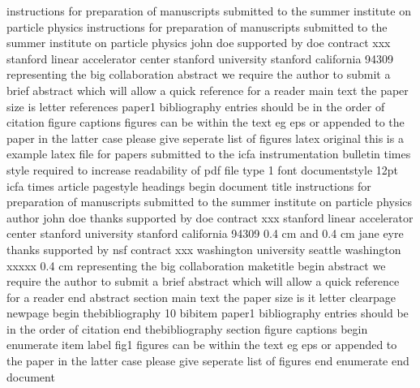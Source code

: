 instructions for preparation of manuscripts submitted to the summer institute on particle physics instructions for preparation of manuscripts submitted to the summer institute on particle physics john doe supported by doe contract xxx stanford linear accelerator center stanford university stanford california 94309 representing the big collaboration abstract we require the author to submit a brief abstract which will allow a quick reference for a reader main text the paper size is letter references paper1 bibliography entries should be in the order of citation figure captions figures can be within the text eg eps or appended to the paper in the latter case please give seperate list of figures latex original this is a example latex file for papers submitted to the icfa instrumentation bulletin times style required to increase readability of pdf file type 1 font documentstyle 12pt icfa times article pagestyle headings begin document title instructions for preparation of manuscripts submitted to the summer institute on particle physics author john doe thanks supported by doe contract xxx stanford linear accelerator center stanford university stanford california 94309 0.4 cm and 0.4 cm jane eyre thanks supported by nsf contract xxx washington university seattle washington xxxxx 0.4 cm representing the big collaboration maketitle begin abstract we require the author to submit a brief abstract which will allow a quick reference for a reader end abstract section main text the paper size is it letter clearpage newpage begin thebibliography 10 bibitem paper1 bibliography entries should be in the order of citation end thebibliography section figure captions begin enumerate item label fig1 figures can be within the text eg eps or appended to the paper in the latter case please give seperate list of figures end enumerate end document
